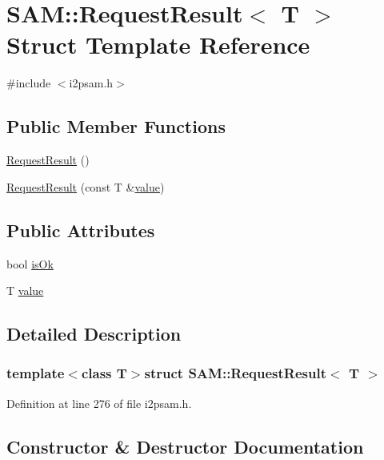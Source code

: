 \hypertarget{struct_s_a_m_1_1_request_result}{}\section{S\+A\+M\+:\+:Request\+Result$<$ T $>$ Struct Template Reference}
\label{struct_s_a_m_1_1_request_result}


{\ttfamily \#include $<$i2psam.\+h$>$}

\subsection*{Public Member Functions}
\begin{DoxyCompactItemize}
\item 
\hyperlink{struct_s_a_m_1_1_request_result_a96712782da53b4064ed6c9c4f8410267}{Request\+Result} ()
\item 
\hyperlink{struct_s_a_m_1_1_request_result_a7132f74c58e55248df2ac560dabad7b9}{Request\+Result} (const T \&\hyperlink{struct_s_a_m_1_1_request_result_a8253483e546b2075a1dda00ef1fb310a}{value})
\end{DoxyCompactItemize}
\subsection*{Public Attributes}
\begin{DoxyCompactItemize}
\item 
bool \hyperlink{struct_s_a_m_1_1_request_result_a417f74624c0c9426eeca809613a56ada}{is\+Ok}
\item 
T \hyperlink{struct_s_a_m_1_1_request_result_a8253483e546b2075a1dda00ef1fb310a}{value}
\end{DoxyCompactItemize}


\subsection{Detailed Description}
\subsubsection*{template$<$class T$>$struct S\+A\+M\+::\+Request\+Result$<$ T $>$}



Definition at line 276 of file i2psam.\+h.



\subsection{Constructor \& Destructor Documentation}
\hypertarget{struct_s_a_m_1_1_request_result_a96712782da53b4064ed6c9c4f8410267}{}
